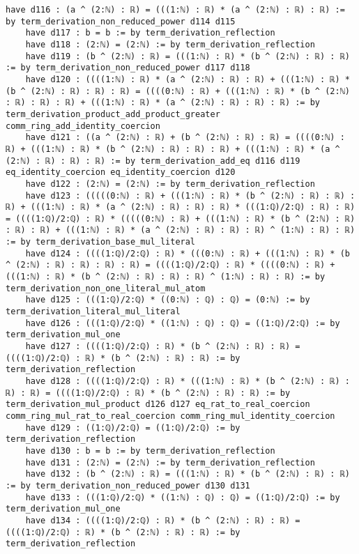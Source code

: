 \documentclass{article}
\begin{document}
\begin{tcolorbox}[colback=white!10, width=\linewidth]
\begin{lstlisting}[language=Lean4]
    have d116 : (a ^ (2:ℕ) : ℝ) = (((1:ℕ) : ℝ) * (a ^ (2:ℕ) : ℝ) : ℝ) := by term_derivation_non_reduced_power d114 d115
    have d117 : b = b := by term_derivation_reflection
    have d118 : (2:ℕ) = (2:ℕ) := by term_derivation_reflection
    have d119 : (b ^ (2:ℕ) : ℝ) = (((1:ℕ) : ℝ) * (b ^ (2:ℕ) : ℝ) : ℝ) := by term_derivation_non_reduced_power d117 d118
    have d120 : ((((1:ℕ) : ℝ) * (a ^ (2:ℕ) : ℝ) : ℝ) + (((1:ℕ) : ℝ) * (b ^ (2:ℕ) : ℝ) : ℝ) : ℝ) = ((((0:ℕ) : ℝ) + (((1:ℕ) : ℝ) * (b ^ (2:ℕ) : ℝ) : ℝ) : ℝ) + (((1:ℕ) : ℝ) * (a ^ (2:ℕ) : ℝ) : ℝ) : ℝ) := by term_derivation_product_add_product_greater comm_ring_add_identity_coercion
    have d121 : ((a ^ (2:ℕ) : ℝ) + (b ^ (2:ℕ) : ℝ) : ℝ) = ((((0:ℕ) : ℝ) + (((1:ℕ) : ℝ) * (b ^ (2:ℕ) : ℝ) : ℝ) : ℝ) + (((1:ℕ) : ℝ) * (a ^ (2:ℕ) : ℝ) : ℝ) : ℝ) := by term_derivation_add_eq d116 d119 eq_identity_coercion eq_identity_coercion d120
    have d122 : (2:ℕ) = (2:ℕ) := by term_derivation_reflection
    have d123 : (((((0:ℕ) : ℝ) + (((1:ℕ) : ℝ) * (b ^ (2:ℕ) : ℝ) : ℝ) : ℝ) + (((1:ℕ) : ℝ) * (a ^ (2:ℕ) : ℝ) : ℝ) : ℝ) * (((1:ℚ)/2:ℚ) : ℝ) : ℝ) = ((((1:ℚ)/2:ℚ) : ℝ) * (((((0:ℕ) : ℝ) + (((1:ℕ) : ℝ) * (b ^ (2:ℕ) : ℝ) : ℝ) : ℝ) + (((1:ℕ) : ℝ) * (a ^ (2:ℕ) : ℝ) : ℝ) : ℝ) ^ (1:ℕ) : ℝ) : ℝ) := by term_derivation_base_mul_literal
    have d124 : ((((1:ℚ)/2:ℚ) : ℝ) * (((0:ℕ) : ℝ) + (((1:ℕ) : ℝ) * (b ^ (2:ℕ) : ℝ) : ℝ) : ℝ) : ℝ) = ((((1:ℚ)/2:ℚ) : ℝ) * ((((0:ℕ) : ℝ) + (((1:ℕ) : ℝ) * (b ^ (2:ℕ) : ℝ) : ℝ) : ℝ) ^ (1:ℕ) : ℝ) : ℝ) := by term_derivation_non_one_literal_mul_atom
    have d125 : (((1:ℚ)/2:ℚ) * ((0:ℕ) : ℚ) : ℚ) = (0:ℕ) := by term_derivation_literal_mul_literal
    have d126 : (((1:ℚ)/2:ℚ) * ((1:ℕ) : ℚ) : ℚ) = ((1:ℚ)/2:ℚ) := by term_derivation_mul_one
    have d127 : ((((1:ℚ)/2:ℚ) : ℝ) * (b ^ (2:ℕ) : ℝ) : ℝ) = ((((1:ℚ)/2:ℚ) : ℝ) * (b ^ (2:ℕ) : ℝ) : ℝ) := by term_derivation_reflection
    have d128 : ((((1:ℚ)/2:ℚ) : ℝ) * (((1:ℕ) : ℝ) * (b ^ (2:ℕ) : ℝ) : ℝ) : ℝ) = ((((1:ℚ)/2:ℚ) : ℝ) * (b ^ (2:ℕ) : ℝ) : ℝ) := by term_derivation_mul_product d126 d127 eq_rat_to_real_coercion comm_ring_mul_rat_to_real_coercion comm_ring_mul_identity_coercion
    have d129 : ((1:ℚ)/2:ℚ) = ((1:ℚ)/2:ℚ) := by term_derivation_reflection
    have d130 : b = b := by term_derivation_reflection
    have d131 : (2:ℕ) = (2:ℕ) := by term_derivation_reflection
    have d132 : (b ^ (2:ℕ) : ℝ) = (((1:ℕ) : ℝ) * (b ^ (2:ℕ) : ℝ) : ℝ) := by term_derivation_non_reduced_power d130 d131
    have d133 : (((1:ℚ)/2:ℚ) * ((1:ℕ) : ℚ) : ℚ) = ((1:ℚ)/2:ℚ) := by term_derivation_mul_one
    have d134 : ((((1:ℚ)/2:ℚ) : ℝ) * (b ^ (2:ℕ) : ℝ) : ℝ) = ((((1:ℚ)/2:ℚ) : ℝ) * (b ^ (2:ℕ) : ℝ) : ℝ) := by term_derivation_reflection

\end{lstlisting}
\end{tcolorbox}
\end{document}
